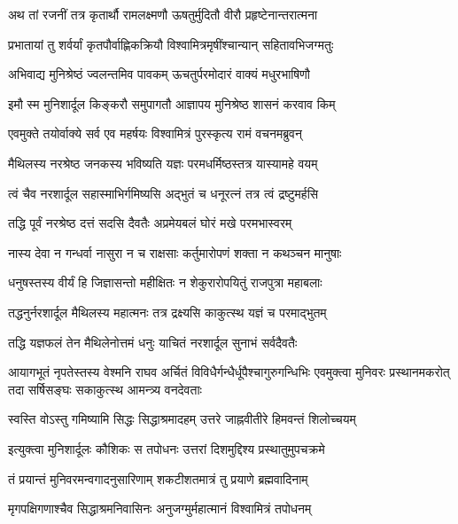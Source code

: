 
\twolineshloka
{अथ तां रजनीं तत्र कृतार्थौ रामलक्ष्मणौ}
{ऊषतुर्मुदितौ वीरौ प्रहृष्टेनान्तरात्मना} %

\twolineshloka
{प्रभातायां तु शर्वर्यां कृतपौर्वाह्णिकक्रियौ}
{विश्वामित्रमृषींश्चान्यान् सहितावभिजग्मतुः} %

\twolineshloka
{अभिवाद्य मुनिश्रेष्ठं ज्वलन्तमिव पावकम्}
{ऊचतुर्परमोदारं वाक्यं मधुरभाषिणौ} %

\twolineshloka
{इमौ स्म मुनिशार्दूल किङ्करौ समुपागतौ}
{आज्ञापय मुनिश्रेष्ठ शासनं करवाव किम्} %

\twolineshloka
{एवमुक्ते तयोर्वाक्ये सर्व एव महर्षयः}
{विश्वामित्रं पुरस्कृत्य रामं वचनमब्रुवन्} %

\twolineshloka
{मैथिलस्य नरश्रेष्ठ जनकस्य भविष्यति}
{यज्ञः परमधर्मिष्ठस्तत्र यास्यामहे वयम्} %

\twolineshloka
{त्वं चैव नरशार्दूल सहास्माभिर्गमिष्यसि}
{अद्भुतं च धनूरत्नं तत्र त्वं द्रष्टुमर्हसि} %

\twolineshloka
{तद्धि पूर्वं नरश्रेष्ठ दत्तं सदसि दैवतैः}
{अप्रमेयबलं घोरं मखे परमभास्वरम्} %

\twolineshloka
{नास्य देवा न गन्धर्वा नासुरा न च राक्षसाः}
{कर्तुमारोपणं शक्ता न कथञ्चन मानुषाः} %

\twolineshloka
{धनुषस्तस्य वीर्यं हि जिज्ञासन्तो महीक्षितः}
{न शेकुरारोपयितुं राजपुत्रा महाबलाः} %

\twolineshloka
{तद्धनुर्नरशार्दूल मैथिलस्य महात्मनः}
{तत्र द्रक्ष्यसि काकुत्स्थ यज्ञं च परमाद्भुतम्} %

\twolineshloka
{तद्धि यज्ञफलं तेन मैथिलेनोत्तमं धनुः}
{याचितं नरशार्दूल सुनाभं सर्वदैवतैः} %

\threelineshloka
{आयागभूतं नृपतेस्तस्य वेश्मनि राघव}
{अर्चितं विविधैर्गन्धैर्धूपैश्चागुरुगन्धिभिः एवमुक्त्वा मुनिवरः प्रस्थानमकरोत् तदा}
{सर्षिसङ्घः सकाकुत्स्थ आमन्त्र्य वनदेवताः} %

\twolineshloka
{स्वस्ति वोऽस्तु गमिष्यामि सिद्धः सिद्धाश्रमादहम्}
{उत्तरे जाह्नवीतीरे हिमवन्तं शिलोच्चयम्} %

\twolineshloka
{इत्युक्त्वा मुनिशार्दूलः कौशिकः स तपोधनः}
{उत्तरां दिशमुद्दिश्य प्रस्थातुमुपचक्रमे} %

\twolineshloka
{तं प्रयान्तं मुनिवरमन्वगादनुसारिणाम्}
{शकटीशतमात्रं तु प्रयाणे ब्रह्मवादिनाम्} %

\twolineshloka
{मृगपक्षिगणाश्चैव सिद्धाश्रमनिवासिनः}
{अनुजग्मुर्महात्मानं विश्वामित्रं तपोधनम्} %

